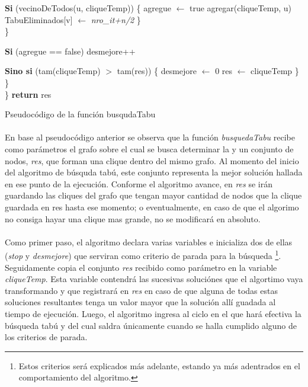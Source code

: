 \begin{algorithm}[H]
	\BlankLine		
	\tab \tab \tab \textbf{Si} (vecinoDeTodos(u, cliqueTemp)) \{ 								
	\tab \tab \tab \tab agregue $\leftarrow$ true												
	\tab \tab \tab \tab agregar(cliqueTemp, u) 													
	\tab \tab \tab \tab TabuEliminados[v] $\leftarrow$ \textit{nro\_it+n/2}					
	\tab \tab \tab \} \\
	\tab \tab \}

	\BlankLine \BlankLine		
	\tab \tab \textbf{Si} (agregue == false) 													
	\tab \tab \tab desmejore++																	
	
	\BlankLine \BlankLine
	\tab \tab \textbf{Sino si} (tam(cliqueTemp) $>$ tam(res)) \{								
	\tab \tab \tab desmejore $\leftarrow$ 0													
	\tab \tab \tab res $\leftarrow$ cliqueTemp													
	\tab \tab \} \\
	\tab \} \\
	\}
	\BlankLine \BlankLine		
	\textbf{return} res																			
\caption{Pseudocódigo de la función busqudaTabu} 
\end{algorithm}
\normalsize

\paragraph{}
En base al pseudocódigo anterior se observa que la función \textit{busquedaTabu} recibe como parámetros el grafo sobre el cual se busca determinar la \mc y un conjunto de nodos, \textit{res}, que forman una clique dentro del mismo grafo. Al momento del inicio del algoritmo de búsquda tabú, este conjunto representa la mejor solución hallada en ese punto de la ejecución. Conforme el algoritmo avance, en \textit{res} se irán guardando las cliques del grafo que tengan mayor cantidad de nodos que la clique guardada en res hasta ese momento; o eventualmente, en caso de que el algorimo no consiga hayar una clique mas grande, no se modificará en absoluto.

\paragraph{}
Como primer paso, el algoritmo declara varias variables e inicializa dos de ellas (\textit{stop} y \textit{desmejore}) que serviran como criterio de parada para la búsqueda \footnote{Estos criterios será explicados más adelante, estando ya más adentrados en el comportamiento del algoritmo.}. Seguidamente copia el conjunto \textit{res} recibido como parámetro en la variable \textit{cliqueTemp}. Esta variable contendrá las sucesivas soluciónes que el algortimo vaya transformando y que registrará en \textit{res} en caso de que alguna de todas estas soluciones resultantes tenga un valor mayor que la solución allí guadada al tiempo de ejecución. Luego, el algoritmo ingresa al ciclo en el que hará efectiva la búsqueda tabú y del cual saldra únicamente cuando se halla cumplido alguno de los criterios de parada.  

